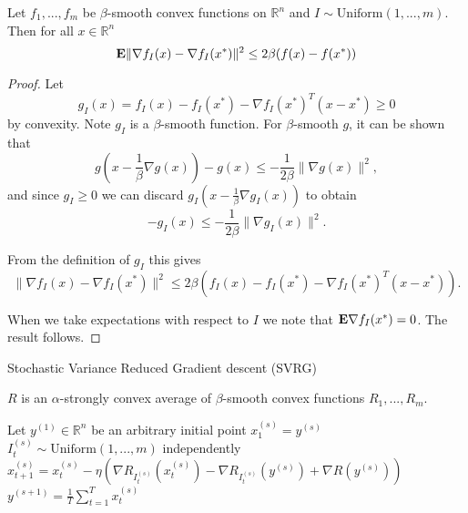 \begin{lemma}
\label{lemma:randsmoothbound}
Let $f_1, ..., f_m$ be $\beta$-smooth convex functions on $\mathbb{R}^n$ and $I \sim \text{Uniform}(1, ..., m)$. Then for all $x \in \mathbb{R}^n$
\begin{equation*}
	\mathbf{E} \|\nabla f_I(x) - \nabla f_I(x^*)\|^2 \le 2\beta (f(x) - f(x^*))
\end{equation*} 
\begin{proof}
Let
\begin{equation*}
	g_I(x) = f_I(x) - f_I(x^*) - \nabla f_I(x^*)^T(x-x^*) \ge 0
\end{equation*}
by convexity. Note $g_I$ is a $\beta$-smooth function.
For $\beta$-smooth $g$, it can be shown that
\begin{equation*}
	g\left(x - \frac{1}{\beta}\nabla g(x)\right) - g(x) \le -\frac{1}{2\beta}\|\nabla g(x)\|^2,
\end{equation*}
and since $g_I \ge 0$ we can discard $g_I\left(x - \frac{1}{\beta}\nabla g_I(x)\right)$ to obtain
\begin{equation*}
 -g_I(x) \le -\frac{1}{2\beta}\|\nabla g_I(x)\|^2.
\end{equation*}

From the definition of $g_I$ this gives
\begin{equation*}
	\|\nabla f_I(x) - \nabla f_I(x^*)\|^2 \le 2\beta \left(f_I(x) - f_I(x^*) - \nabla f_I(x^*)^T (x - x^*)\right).
\end{equation*}

When we take expectations with respect to $I$ we note that $\mathbf{E} \nabla f_I(x^*) = 0$. The result follows.

\end{proof}
\end{lemma}

\begin{algorithm}
\caption{Stochastic Variance Reduced Gradient descent (SVRG)}
   \begin{algorithmic}[1] \label{alg:svrg}
   \REQUIRE $R$ is an $\alpha$-strongly convex average of $\beta$-smooth convex functions $R_1, ..., R_m$.
   
   \STATE Let $y^{(1)} \in \mathbb{R}^n$ be an arbitrary initial point
   	  \STATE $x_1^{(s)} = y^{(s)}$
   	      \STATE $I_t^{(s)} \sim \text{Uniform}(1, ..., m)$ independently
   	  	  \STATE $x_{t+1}^{(s)} = x_t^{(s)} - \eta \left(\nabla R_{I_t^{(s)}}(x_t^{(s)}) - \nabla R_{I_t^{(s)}}(y^{(s)}) + \nabla R(y^{(s)})\right)$
   	  \ENDFOR
   	  \STATE $y^{(s+1)} = \frac{1}{T}\sum_{t=1}^T x_t^{(s)}$
   \ENDFOR	  
\end{algorithmic}
\end{algorithm}

